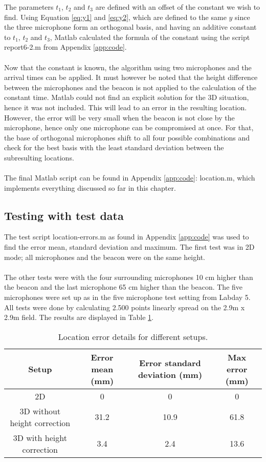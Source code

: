 \documentclass[final]{scrreprt} %
\begin{document}
The parameters $t_1$, $t_2$ and $t_3$ are defined with an offset of the constant we wish to find.
Using Equation \ref{eq:y1} and \ref{eq:y2}, which are defined to the same $y$ since the three microphone form an orthogonal basis, and having an additive constant to $t_1$, $t_2$ and $t_3$, Matlab calculated the formula of the constant using the script report6-2.m from Appendix \ref{app:code}.
\\ \\
Now that the constant is known, the algorithm using two microphones and the arrival times can be applied.
It must however be noted that the height difference between the microphones and the beacon is not applied to the calculation of the constant time.
Matlab could not find an explicit solution for the 3D situation, hence it was not included.
This will lead to an error in the resulting location.
However, the error will be very small when the beacon is not close by the microphone, hence only one microphone can be compromised at once.
For that, the base of orthogonal microphones shift to all four possible combinations and check for the best basis with the least standard deviation between the subresulting locations.
\\ \\
The final Matlab script can be found in Appendix \ref{app:code}: location.m, which implements everything discussed so far in this chapter.

\subsection{Testing with test data}
\label{sec:testing}
The test script location-errors.m as found in Appendix \ref{app:code} was used to find the error mean, standard deviation and maximum.
The first test was in 2D mode; all microphones and the beacon were on the same height.
\\ \\
The other tests were with the four surrounding microphones 10 cm higher than the beacon and the last microphone 65 cm higher than the beacon.
The five microphones were set up as in the five microphone test setting from Labday 5.
All tests were done by calculating 2.500 points linearly spread on the 2.9m x 2.9m field.
The results are displayed in Table \ref{tab:errors}.

\begin{table} [H]
\centering
	\begin{tabular}{ c | c | c | c }
  	Setup & Error mean (mm) & Error standard deviation (mm) & Max error (mm) \\ \hline
  	2D & 0 & 0 & 0 \\
  	3D without height correction & 31.2 & 10.9 & 61.8 \\
	3D with height correction & 3.4 & 2.4 & 13.6 \\
	\end{tabular}
\caption{Location error details for different setups.}
\label{tab:errors}
\end{table}
\end{document}
